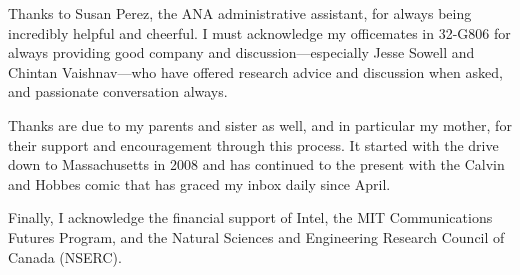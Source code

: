 Thanks to Susan Perez, the ANA administrative assistant, for always being incredibly helpful and cheerful. I must acknowledge my officemates in 32-G806 for always providing good company and discussion---especially Jesse Sowell and Chintan Vaishnav---who have offered research advice and discussion when asked, and passionate conversation always.

Thanks are due to my parents and sister as well, and in particular my mother, for their support and encouragement through this process. It started with the drive down to Massachusetts in 2008 and has continued to the present with the Calvin and Hobbes comic that has graced my inbox daily since April.

Finally, I acknowledge the financial support of Intel, the MIT Communications Futures Program, and the Natural Sciences and Engineering Research Council of Canada (NSERC).